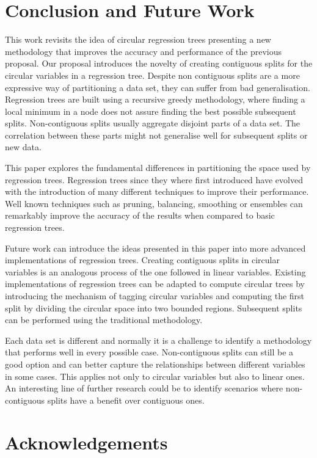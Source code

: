 \documentclass[times,twocolumn,final,authoryear]{elsarticle}
\begin{document}
\section{Conclusion and Future Work}
\label{sec:5}
This work revisits the idea of circular regression trees presenting a new methodology that improves the accuracy and performance of the previous proposal. Our proposal introduces the novelty of creating contiguous splits for the circular variables in a regression tree. Despite non contiguous splits are a more expressive way of partitioning a data set, they can suffer from bad generalisation. Regression trees are built using a recursive greedy methodology, where finding a local minimum in a node does not assure finding the best possible subsequent splits. Non-contiguous splits usually aggregate disjoint parts of a data set. The correlation between these parts might not generalise well for subsequent splits or new data.

This paper explores the fundamental differences in partitioning the space used by regression trees. Regression trees since they where first introduced have evolved with the introduction of many different techniques to improve their performance. Well known techniques such as pruning, balancing, smoothing \citep{Breimanetal1984, Quinlan1993} or ensembles \citep{Buhlmann2012} can remarkably improve the accuracy of the results when compared to basic regression trees.

Future work can introduce the ideas presented in this paper into more advanced implementations of regression trees. Creating contiguous splits in circular variables is an analogous process of the one followed in linear variables. Existing implementations of regression trees can be adapted to compute circular trees by introducing the mechanism of tagging circular variables and computing the first split by dividing the circular space into two bounded regions. Subsequent splits can be performed using the traditional methodology.

Each data set is different and normally it is a challenge to identify a methodology that performs well in every possible case. Non-contiguous splits can still be a good option and can better capture the relationships between different variables in some cases. This applies not only to circular variables but also to linear ones. An interesting line of further research could be to identify scenarios where non-contiguous splits have a benefit over contiguous ones.


\section*{Acknowledgements}
\end{document}
